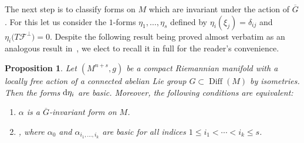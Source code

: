 \documentclass[pdftex]{sigma}
\numberwithin{equation}{section}
\newtheorem{prop}[tw]{Proposition}
\theoremstyle{definition}
\begin{document}
The next step is to classify forms on $M$ which are invariant under the action of $\overline{G}$. For this let us consider the $1$-forms $\eta_1,\dots,\eta_s$ defined by $\eta_i(\xi_j)=\delta_{ij}$ and $\eta_i\bigl(T\mathcal{F}^{\perp}\bigr)=0$. Despite the following result being proved almost verbatim as an analogous result in~\cite{My3}, we elect to recall it in full for the reader's convenience.

\begin{prop}\label{InvFor} Let $(M^{n+s},g)$ be a compact Riemannian manifold with a locally free action of a connected abelian Lie group $G\subset \operatorname{Diff}(M)$ by isometries. Then the forms ${\rm d}\eta_i$ are basic. Moreover, the following conditions are equivalent:
\begin{enumerate}\itemsep=0pt
\item[$(1)$] $\alpha$ is a $\overline{G}$-invariant form on $M$.
\item[$(2)$] , where $\alpha_0$ and $\alpha_{i_1,\dots,i_k}$ are basic for all indices $1\leq i_1<\cdots <i_k\leq s$.
\end{enumerate}
\end{prop}
\end{document}
